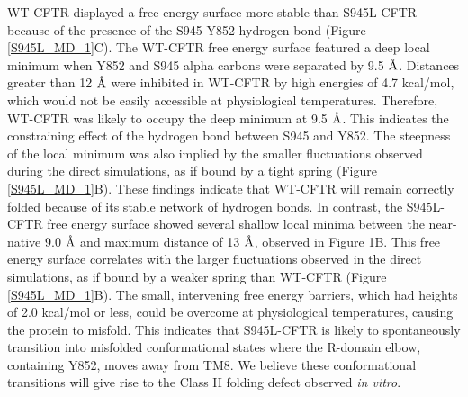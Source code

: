 WT-CFTR displayed a free energy surface more stable than S945L-CFTR because of the presence of the S945-Y852 hydrogen bond (Figure \ref{S945L_MD_1}C). The WT-CFTR free energy surface featured a deep local minimum when Y852 and S945 alpha carbons were separated by 9.5 $\mbox{\textup{\AA}}$. Distances greater than 12 $\mbox{\textup{\AA}}$ were inhibited in WT-CFTR by high energies of 4.7 kcal/mol, which would not be easily accessible at physiological temperatures. Therefore, WT-CFTR was likely to occupy the deep minimum at 9.5 $\mbox{\textup{\AA}}$. This indicates the constraining effect of the hydrogen bond between S945 and Y852. The steepness of the local minimum was also implied by the smaller fluctuations observed during the direct simulations, as if bound by a tight spring (Figure \ref{S945L_MD_1}B). These findings indicate that WT-CFTR will remain correctly folded because of its stable network of hydrogen bonds. In contrast, the S945L-CFTR free energy surface showed several shallow local minima between the near-native 9.0 $\mbox{\textup{\AA}}$ and maximum distance of 13 $\mbox{\textup{\AA}}$, observed in Figure 1B. This free energy surface correlates with the larger fluctuations observed in the direct simulations, as if bound by a weaker spring than WT-CFTR (Figure \ref{S945L_MD_1}B). The small, intervening free energy barriers, which had heights of 2.0 kcal/mol or less, could be overcome at physiological temperatures, causing the protein to misfold. This indicates that S945L-CFTR is likely to spontaneously transition into misfolded conformational states where the R-domain elbow, containing Y852, moves away from TM8. We believe these conformational transitions will give rise to the Class II folding defect observed \textit{in vitro}. 

